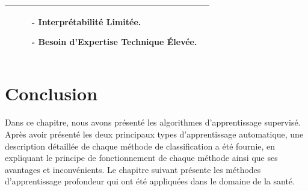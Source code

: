 \begin{table}[h]
\begin{tabular}{| m{3cm}| m{6cm}| m{6cm}|}
\begin{itemize}
  \end{itemize}
 & 
 \begin{itemize}
 \item[-]Interprétabilité Limitée.
 \item[-]Besoin d'Expertise Technique Élevée.
 
 \end{itemize}
\\
 \hline
\end{tabular}
\end{table}

\newpage
\section{Conclusion}
Dans ce chapitre, nous avons présenté les algorithmes d'apprentissage supervisé. 
Après avoir présenté les deux principaux types d’apprentissage automatique, une description détaillée de chaque méthode de classification a été fournie, en expliquant le principe de fonctionnement de chaque méthode ainsi que ses avantages et inconvénients.
Le chapitre suivant présente les méthodes d’apprentissage profondeur qui ont été appliquées dans le domaine de la santé.
